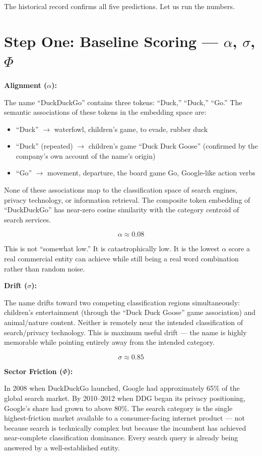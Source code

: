 \documentclass[12pt, openany]{book}
\theoremstyle{thmstyle}
\theoremstyle{defstyle}
\begin{document}
The historical record confirms all five predictions. Let us run the numbers.

\section{Step One: Baseline Scoring --- $\alpha$, $\sigma$, $\Phi$}

\textbf{Alignment ($\alpha$):}

The name ``DuckDuckGo'' contains three tokens: ``Duck,'' ``Duck,'' ``Go.'' The semantic associations of these tokens in the embedding space are:
\begin{itemize}[leftmargin=1.5em]
  \item ``Duck'' $\rightarrow$ waterfowl, children's game, to evade, rubber duck
  \item ``Duck'' (repeated) $\rightarrow$ children's game ``Duck Duck Goose'' (confirmed by the company's own account of the name's origin)
  \item ``Go'' $\rightarrow$ movement, departure, the board game Go, Google-like action verbs
\end{itemize}

None of these associations map to the classification space of search engines, privacy technology, or information retrieval. The composite token embedding of ``DuckDuckGo'' has near-zero cosine similarity with the category centroid of search services.

\[
\alpha \approx 0.08
\]

This is not ``somewhat low.'' It is catastrophically low. It is the lowest $\alpha$ score a real commercial entity can achieve while still being a real word combination rather than random noise.

\textbf{Drift ($\sigma$):}

The name drifts toward two competing classification regions simultaneously: children's entertainment (through the ``Duck Duck Goose'' game association) and animal/nature content. Neither is remotely near the intended classification of search/privacy technology. This is maximum useful drift --- the name is highly memorable while pointing entirely away from the intended category.

\[
\sigma \approx 0.85
\]

\textbf{Sector Friction ($\Phi$):}

In 2008 when DuckDuckGo launched, Google had approximately 65\% of the global search market. By 2010--2012 when DDG began its privacy positioning, Google's share had grown to above 80\%. The search category is the single highest-friction market available to a consumer-facing internet product --- not because search is technically complex but because the incumbent has achieved near-complete classification dominance. Every search query is already being answered by a well-established entity.
\end{document}
